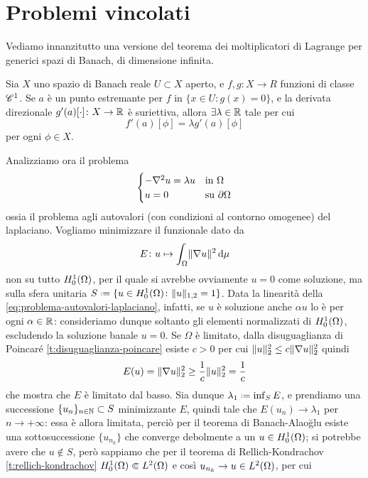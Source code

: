 \section{Problemi vincolati}
Vediamo innanzitutto una versione del teorema dei moltiplicatori di Lagrange per generici spazi di Banach, di dimensione infinita.
\begin{teorema}[Lagrange] \label{t:lagrange-dimensione-infinita}
    Sia $X$ uno spazio di Banach reale $U\subset X$ aperto, e $f,g\colon X\to R$ funzioni di classe $\cclass[1]$.
    Se $a$ è un punto estremante per $f$ in $\{x\in U\colon g(x)=0\}$, e la derivata direzionale $g'(a)[\cdot]\colon X\to\R$ è suriettiva, allora $\exists\lambda\in\R$ tale per cui
    \begin{equation}
        f'(a)[\phi]=\lambda g'(a)[\phi]
    \end{equation}
    per ogni $\phi\in X$.
\end{teorema}
Analizziamo ora il problema
\begin{equation}
    \begin{cases}
        -\lap u=\lambda u & \text{in }\Omega\\
        u=0               & \text{su }\boundary\Omega
    \end{cases}
    \label{eq:problema-autovalori-laplaciano}
\end{equation}
ossia il problema agli autovalori (con condizioni al contorno omogenee) del laplaciano.
Vogliamo minimizzare il funzionale dato da
\begin{equation}
    E\colon u\mapsto\int_\Omega\norm{\grad u}^2\,\dd\mu
\end{equation}
non su tutto $\sobHc[1]{\Omega}$, per il quale si avrebbe ovviamente $u=0$ come soluzione, ma sulla sfera unitaria $S\defeq\{u\in\sobHc[1]{\Omega}\colon\norm{u}_{1,2}=1\}$.
Data la linearità della \eqref{eq:problema-autovalori-laplaciano}, infatti, se $u$ è soluzione anche $\alpha u$ lo è per ogni $\alpha\in\R$: consideriamo dunque soltanto gli elementi normalizzati di $\sobHc[1]{\Omega}$, escludendo la soluzione banale $u=0$.
Se $\Omega$ è limitato, dalla disuguaglianza di Poincar\'e \ref{t:disuguaglianza-poincare} esiste $c>0$ per cui $\norm{u}_2^2\le c\norm{\grad u}_2^2$ quindi
\begin{equation}
    E(u)=\norm{\grad u}_2^2\ge\frac1{c}\norm{u}_2^{2}=\frac1{c}
\end{equation}
che mostra che $E$ è limitato dal basso.
Sia dunque $\lambda_1\defeq\inf_S E$, e prendiamo una successione $\{u_n\}_{n\in\N}\subset S$ minimizzante $E$, quindi tale che $E(u_n)\to\lambda_1$ per $n\to+\infty$: essa è allora limitata, perciò per il teorema di Banach-Alao\u{g}lu esiste una sottosuccessione $\{u_{n_k}\}$ che converge debolmente a un $u\in\sobHc[1]{\Omega}$; si potrebbe avere che $u\notin S$, però sappiamo che per il teorema di Rellich-Kondrachov \ref{t:rellich-kondrachov} $\sobHc[1]{\Omega}\cemb\leb[2]{\Omega}$ e cos\`i $u_{n_k}\to u\in\leb[2]{\Omega}$, per cui
